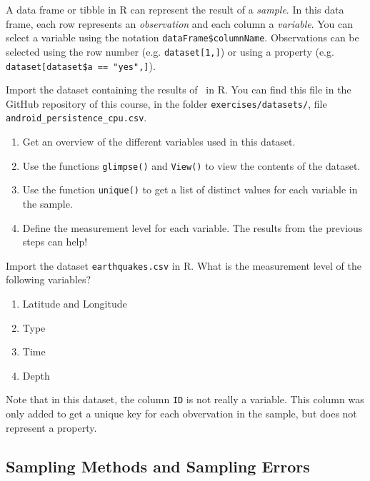 A data frame or tibble in R can represent the result of a \textit{sample}. 
In this data frame, each row represents an \textit{observation} and each column a \textit{variable}. 
You can select a variable using the notation \texttt{dataFrame\$columnName}. 
Observations can be selected using the row number (e.g. \texttt{dataset[1,]}) or using a property (e.g. \verb|dataset[dataset$a == "yes",]|).

\begin{exercise}
    Import the dataset containing the results of~\textcite{Akin2016} in R. 
    You can find this file in the GitHub repository of this course, in the folder
    \texttt{exercises/datasets/}, 
    file \texttt{android\_persistence\_cpu.csv}.
    
    \begin{enumerate}
        \item Get an overview of the different variables used in this dataset.
        \item Use the functions \texttt{glimpse()} and \texttt{View()} to view the contents of the dataset.
        \item Use the function \texttt{unique()} to get a list of distinct values for each variable in the sample.
        \item Define the measurement level for each variable. The results from the previous steps can help!
      \end{enumerate}
\end{exercise}

\begin{exercise}
  Import the dataset \texttt{earthquakes.csv} in R.
  What is the measurement level of the following variables?
  
  \begin{enumerate}
    \item Latitude and Longitude
    \item Type
    \item Time
    \item Depth
  \end{enumerate}

  Note that in this dataset, the column \texttt{ID} is not really a variable. 
  This column was only added to get a unique key for each obvervation in the sample, but does not represent a property.
\end{exercise}

\subsection{Sampling Methods and Sampling Errors}

